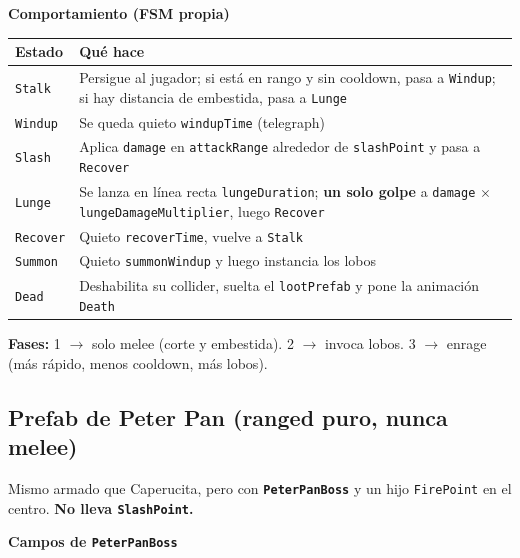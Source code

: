 \documentclass[a4paper,12pt]{article}
\newcommand{\code}[1]{\texttt{#1}}
\begin{document}
\textbf{Comportamiento (FSM propia)}

\begin{center}
\begin{longtable}{|l|p{8.8cm}|}
\hline
\textbf{Estado} & \textbf{Qué hace} \\
\hline
\endhead
\code{Stalk} & Persigue al jugador; si está en rango y sin cooldown, pasa a \code{Windup}; si hay distancia de embestida, pasa a \code{Lunge} \\
\hline
\code{Windup} & Se queda quieto \code{windupTime} (telegraph) \\
\hline
\code{Slash} & Aplica \code{damage} en \code{attackRange} alrededor de \code{slashPoint} y pasa a \code{Recover} \\
\hline
\code{Lunge} & Se lanza en línea recta \code{lungeDuration}; \textbf{un solo golpe} a \code{damage} $\times$ \code{lungeDamageMultiplier}, luego \code{Recover} \\
\hline
\code{Recover} & Quieto \code{recoverTime}, vuelve a \code{Stalk} \\
\hline
\code{Summon} & Quieto \code{summonWindup} y luego instancia los lobos \\
\hline
\code{Dead} & Deshabilita su collider, suelta el \code{lootPrefab} y pone la animación \code{Death} \\
\hline
\end{longtable}
\end{center}

\textbf{Fases:} 1 $\to$ solo melee (corte y embestida). 2 $\to$ invoca lobos. 3 $\to$ enrage
(más rápido, menos cooldown, más lobos).

\subsection{Prefab de Peter Pan (ranged puro, nunca melee)}

Mismo armado que Caperucita, pero con \textbf{\code{PeterPanBoss}} y un hijo \code{FirePoint} en
el centro. \textbf{No lleva \code{SlashPoint}.}

\textbf{Campos de \code{PeterPanBoss}}
\end{document}
